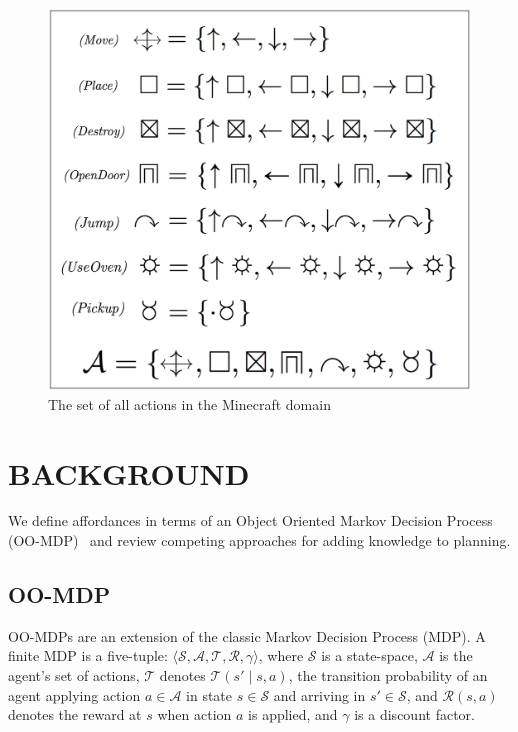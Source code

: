 \documentclass[]{article}
\begin{document}
\begin{figure}
\centering
\includegraphics[scale = 0.15]{figures/all_actions.png}
\caption{The set of all actions in the Minecraft domain \label{fig:all_actions}}
\end{figure}

\section{BACKGROUND}

We define affordances in terms of an Object Oriented Markov Decision
Process (OO-MDP)~\citep{diuk08} and review competing approaches for
adding knowledge to planning.

\subsection{OO-MDP}

OO-MDPs are an extension of the classic Markov Decision Process (MDP).
A finite MDP is a five-tuple: $\langle \mathcal{S}, \mathcal{A},
\mathcal{T}, \mathcal{R}, \gamma \rangle$, where $\mathcal{S}$ is a
state-space, $\mathcal{A}$ is the agent's set of actions,
$\mathcal{T}$ denotes $\mathcal{T}(s' \mid s,a)$, the transition
probability of an agent applying action $a \in \mathcal{A}$ in state
$s \in \mathcal{S}$ and arriving in $s' \in \mathcal{S}$, and
$\mathcal{R}(s,a)$ denotes the reward at $s$ when action $a$ is
applied, and $\gamma$ is a discount factor.
\end{document}
